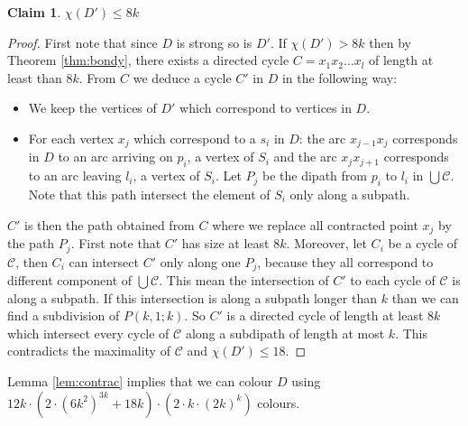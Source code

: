 \documentclass[utf8,10pt]{article}
\theoremstyle{plain}
\newtheorem{claim}{Claim}[theorem]
\theoremstyle{definition}
\theoremstyle{remark}
\newcommand{\dr}{ k \cdot (2k)^k}
\newcommand{\col}{(6k^2)^{3k}}
\begin{document}
\begin{claim}\label{cl:nocycle}
$\chi(D') \leq 8k$
\end{claim} 

\begin{proof}
First note that since $D$ is strong so is $D'$. If $\chi(D') > 8k$ then by Theorem \ref{thm:bondy}, there exists
a directed cycle $C = x_1x_2 \dots x_l$ of length at least than $8k$. From $C$ we deduce a cycle $C'$ in $D$ in the following way: 
\begin{itemize}
	\item We keep the vertices of $D'$ which correspond to vertices in $D$.
	\item For each vertex $x_j$ which correspond to a $s_i$ in $D$: the arc $x_{j-1}x_j$ corresponds in $D$ to an arc arriving on 
		$p_i$, a vertex of $S_i$ and the arc $x_jx_{j+1}$ corresponds to an arc leaving $l_i$, a vertex of $S_i$. Let $P_j$ be the dipath 
		from $p_i$ to $l_i$ in $\bigcup \mathcal{C}$. Note that this path intersect the element of $S_i$ only along a subpath. 
\end{itemize}
$C'$ is then the path obtained from $C$ where we replace all contracted point $x_j$ by the path $P_j$. 
First note that $C'$ has size at least $8k$. Moreover, let $C_i$ be a cycle of $\mathcal{C}$, then $C_i$ can
intersect $C'$ only along one $P_j$, because they all correspond to different component of $\bigcup \mathcal{C}$. This mean the
intersection of $C'$ to each cycle of $\mathcal{C}$ is along a subpath. If this intersection is along a subpath longer than $k$ than we can 
find a subdivision of $P(k,1;k)$. So $C'$ is a directed cycle of length at least $8k$ which intersect every cycle of $\mathcal{C}$ along a 
subdipath of length at most $k$. This contradicts the maximality of $\mathcal{C}$ and $\chi(D') \leq 18$.
\end{proof}


Lemma \ref{lem:contrac} implies that we can colour $D$ using $12k \cdot (2\cdot \col + 18k) \cdot (2 \cdot \dr)$ colours.
\end{document}
